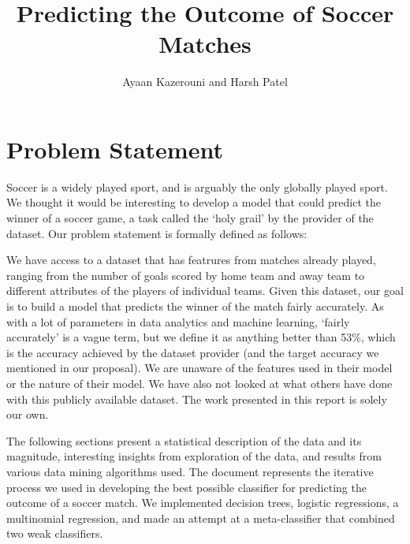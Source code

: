\documentclass[11pt]{article}
\begin{document}
\title{Predicting the Outcome of Soccer Matches}
\author{Ayaan Kazerouni and Harsh Patel}
\date{}
\maketitle

\section{Problem Statement}
Soccer is a widely played sport, and is arguably the only globally played sport.
We thought it would be interesting to develop a model that could predict the winner of a soccer game, a task called the `holy grail' by the provider of the dataset. Our problem statement is formally defined as follows:

We have access to a dataset that has featrures from matches already played, ranging from the number of goals scored by home team and away team to different attributes of the players of individual teams. Given this dataset, our goal is to build a model that predicts the winner of the match fairly accurately.
As with a lot of parameters in data analytics and machine learning, `fairly accurately' is a vague term, but we define it as anything better than 53\%, which is the accuracy achieved by the dataset provider (and the target accuracy we mentioned in our proposal).
We are unaware of the features used in their model or the nature of their model.
We have also not looked at what others have done with this publicly available dataset.
The work presented in this report is solely our own.

The following sections present a statistical description of the data and its magnitude, interesting insights from exploration of the data, and results from various data mining algorithms used.
The document represents the iterative process we used in developing the best possible classifier for predicting the outcome of a soccer match.
We implemented decision trees, logistic regressions, a multinomial regression, and made an attempt at a meta-classifier that combined two weak classifiers.
\end{document}
